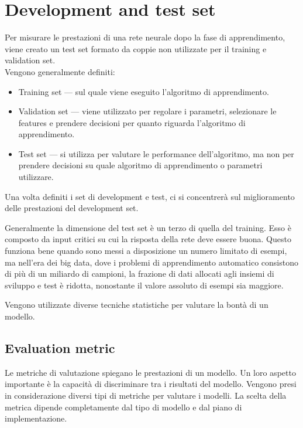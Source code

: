 \section{Development and test set }
\label{sec:DevelopmentAndTestSet}
Per misurare le prestazioni di una rete neurale dopo la fase di apprendimento, viene creato un test set formato da coppie non utilizzate per il training e validation set.\\
Vengono generalmente definiti: 
\begin{itemize}
	\item Training set --- sul quale viene eseguito l'algoritmo di apprendimento.
	\item Validation set --- viene utilizzato per regolare i parametri, selezionare le features e prendere decisioni per quanto riguarda l'algoritmo di apprendimento.
	\item Test set --- si utilizza per valutare le performance dell'algoritmo, ma non per prendere decisioni su quale algoritmo di apprendimento o parametri utilizzare. 
\end{itemize}

Una volta definiti i set di development e test, ci si concentrerà sul miglioramento delle prestazioni del development set. 

Generalmente la dimensione del test set è un terzo di quella del training. Esso è composto da input critici su cui la risposta della rete deve essere buona. 
Questo funziona bene quando sono messi a disposizione un numero limitato di esempi, ma nell'era dei big data, dove i problemi di apprendimento automatico consistono di più di un miliardo di campioni, la frazione di dati allocati agli insiemi di sviluppo e test è ridotta, nonostante il valore assoluto di esempi sia maggiore.

Vengono utilizzate diverse tecniche statistiche per valutare la bontà di un modello.

\subsection{Evaluation metric}
\label{subsec:EvaluationMetric}

Le metriche di valutazione spiegano le prestazioni di un modello. Un loro aspetto importante è la capacità di discriminare tra i risultati del modello.
Vengono presi in considerazione diversi tipi di metriche per valutare i modelli. La scelta della metrica dipende completamente dal tipo di modello e dal piano di implementazione. 
\\

